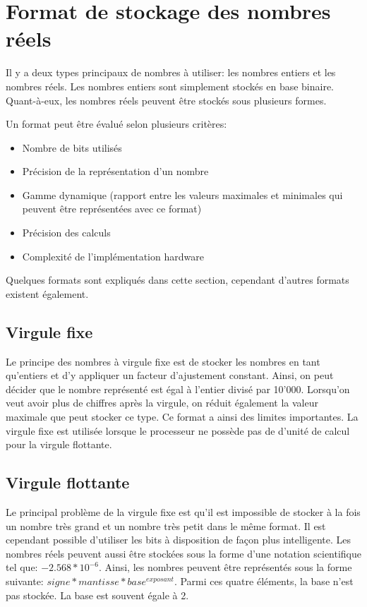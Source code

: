 \section{Format de stockage des nombres réels}

Il y a deux types principaux de nombres à utiliser: les nombres entiers et les nombres réels. Les nombres entiers sont simplement stockés en base binaire. Quant-à-eux, les nombres réels peuvent être stockés sous plusieurs formes.

Un format peut être évalué selon plusieurs critères:
\begin{itemize}
    \item Nombre de bits utilisés
    \item Précision de la représentation d'un nombre
    \item Gamme dynamique (rapport entre les valeurs maximales et minimales qui peuvent être représentées avec ce format)
    \item Précision des calculs
    \item Complexité de l'implémentation hardware
\end{itemize}

Quelques formats sont expliqués dans cette section, cependant d'autres formats existent également.

\subsection{Virgule fixe}

Le principe des nombres à virgule fixe est de stocker les nombres en tant qu'entiers et d'y appliquer un facteur d'ajustement constant. Ainsi, on peut décider que le nombre représenté est égal à l'entier divisé par 10'000. Lorsqu'on veut avoir plus de chiffres après la virgule, on réduit également la valeur maximale que peut stocker ce type. Ce format a ainsi des limites importantes. La virgule fixe est utilisée lorsque le processeur ne possède pas de d'unité de calcul pour la virgule flottante.

\subsection{Virgule flottante}

Le principal problème de la virgule fixe est qu'il est impossible de stocker à la fois un nombre très grand et un nombre très petit dans le même format. Il est cependant possible d'utiliser les bits à disposition de façon plus intelligente. Les nombres réels peuvent aussi être stockées sous la forme d'une notation scientifique tel que: $-2.568 * 10^{-6}$. Ainsi, les nombres peuvent être représentés sous la forme suivante: $signe * mantisse * base^{exposant}$. Parmi ces quatre éléments, la base n'est pas stockée. La base est souvent égale à 2.

